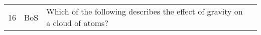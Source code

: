 \documentclass[10pt]{article}
\begin{document}
\begin{tiny}
\begin{longtable}{|r|p{0.375in}|p{1.275in}|p{3.5in}|}
16 &          BoS &                                                                                                                                                                                                      Which of the following describes the effect of gravity on a cloud of atoms? &                                                                                                                                                                                                                                                                                                                                                                                                                                                                                                                                                                                                                                                                                                                                                                                                                                                                                                                                                                                                                                                                                                                                                                                                                                                                                                                                                                                                                                                                                                                                                                                                                                                                                                                                                                                                                                                                                                                                                                                                                                                                                                                                                                                                                                                                                                                                                                                                                                                                                                                                                                                                                                                                                                                                                                                                                                                                                                                                                                                                                                                                                               
\end{longtable}
\end{tiny}
\end{document}
